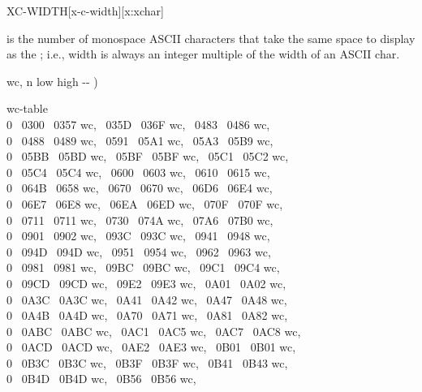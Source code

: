 \begin{worddef*}{}{XC-WIDTH}[x-c-width][x:xchar]
\item {}

	 is the number of monospace ASCII characters that take the same
	space to display as the ; i.e.,  width is always
	an integer multiple of the width of an ASCII char.

	\begin{implement}
	\word{:} wc,  n low high -{}- )   \word{,} \word{,} \word{,} \word{;}

	 wc-table   \\
	0 ~0300 ~0357 wc, ~035D ~036F wc, ~0483 ~0486 wc,\\
	0 ~0488 ~0489 wc, ~0591 ~05A1 wc, ~05A3 ~05B9 wc,\\
	0 ~05BB ~05BD wc, ~05BF ~05BF wc, ~05C1 ~05C2 wc,\\
	0 ~05C4 ~05C4 wc, ~0600 ~0603 wc, ~0610 ~0615 wc,\\
	0 ~064B ~0658 wc, ~0670 ~0670 wc, ~06D6 ~06E4 wc,\\
	0 ~06E7 ~06E8 wc, ~06EA ~06ED wc, ~070F ~070F wc,\\
	0 ~0711 ~0711 wc, ~0730 ~074A wc, ~07A6 ~07B0 wc,\\
	0 ~0901 ~0902 wc, ~093C ~093C wc, ~0941 ~0948 wc,\\
	0 ~094D ~094D wc, ~0951 ~0954 wc, ~0962 ~0963 wc,\\
	0 ~0981 ~0981 wc, ~09BC ~09BC wc, ~09C1 ~09C4 wc,\\
	0 ~09CD ~09CD wc, ~09E2 ~09E3 wc, ~0A01 ~0A02 wc,\\
	0 ~0A3C ~0A3C wc, ~0A41 ~0A42 wc, ~0A47 ~0A48 wc,\\
	0 ~0A4B ~0A4D wc, ~0A70 ~0A71 wc, ~0A81 ~0A82 wc,\\
	0 ~0ABC ~0ABC wc, ~0AC1 ~0AC5 wc, ~0AC7 ~0AC8 wc,\\
	0 ~0ACD ~0ACD wc, ~0AE2 ~0AE3 wc, ~0B01 ~0B01 wc,\\
	0 ~0B3C ~0B3C wc, ~0B3F ~0B3F wc, ~0B41 ~0B43 wc,\\
	0 ~0B4D ~0B4D wc, ~0B56 ~0B56 wc,\tab[2]

\end{implement}
\end{worddef*}
